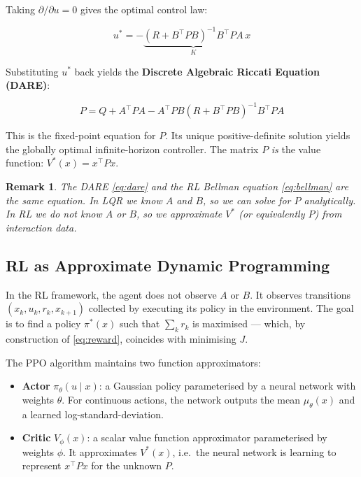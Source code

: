 \documentclass[11pt, a4paper]{article}
\newtheorem{remark}{Remark}
\newcommand{\T}{^\top}
\begin{document}
Taking $\partial/\partial u = 0$ gives the optimal control law:

\begin{equation}
  u^* = -\underbrace{(R + B\T PB)^{-1} B\T PA}_{K}\, x
  \label{eq:lqr_law}
\end{equation}

Substituting $u^*$ back yields the \textbf{Discrete Algebraic Riccati
Equation (DARE)}:

\begin{equation}
  P = Q + A\T PA - A\T PB(R + B\T PB)^{-1}B\T PA
  \label{eq:dare}
\end{equation}

This is the fixed-point equation for $P$. Its unique positive-definite
solution yields the globally optimal infinite-horizon controller. The
matrix $P$ \emph{is} the value function: $V^*(x) = x\T Px$.

\begin{remark}
  The DARE \eqref{eq:dare} and the RL Bellman equation
  \eqref{eq:bellman} are the same equation. In LQR we know $A$ and $B$,
  so we can solve for $P$ analytically. In RL we do not know $A$ or $B$,
  so we approximate $V^*$ (or equivalently $P$) from interaction data.
\end{remark}

\subsection{RL as Approximate Dynamic Programming}

In the RL framework, the agent does not observe $A$ or $B$. It observes
transitions $(x_k, u_k, r_k, x_{k+1})$ collected by executing its
policy in the environment. The goal is to find a policy $\pi^*(x)$ such
that $\sum_k r_k$ is maximised — which, by construction of \eqref{eq:reward},
coincides with minimising $J$.

The PPO algorithm maintains two function approximators:

\begin{itemize}[leftmargin=2em]
  \item \textbf{Actor} $\pi_\theta(u \mid x)$: a Gaussian policy
        parameterised by a neural network with weights $\theta$. For
        continuous actions, the network outputs the mean $\mu_\theta(x)$
        and a learned log-standard-deviation.

  \item \textbf{Critic} $V_\phi(x)$: a scalar value function
        approximator parameterised by weights $\phi$. It approximates
        $V^*(x)$, i.e.\ the neural network is learning to represent
        $x\T Px$ for the unknown $P$.
\end{itemize}
\end{document}
